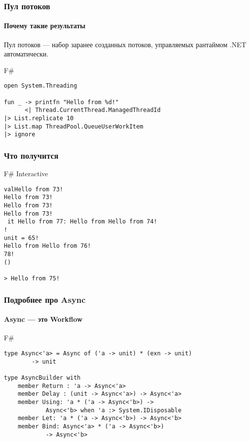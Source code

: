 \documentclass[xetex,mathserif,serif]{beamer}
\begin{document}
	\begin{frame}[fragile]
		\frametitle{Пул потоков}
		\framesubtitle{Почему такие результаты}
		Пул потоков --- набор заранее созданных потоков, управляемых рантаймом .NET автоматически.
		\begin{exampleblock}{F\#}
			\begin{verbatim}
open System.Threading

fun _ -> printfn "Hello from %d!" 
      <| Thread.CurrentThread.ManagedThreadId
|> List.replicate 10
|> List.map ThreadPool.QueueUserWorkItem 
|> ignore
			\end{verbatim}
		\end{exampleblock}
\end{frame}

	\begin{frame}[fragile]
		\frametitle{Что получится}
		\begin{alertblock}{F\# Interactive}
			\begin{verbatim}
valHello from 73! 
Hello from 73! 
Hello from 73! 
Hello from 73! 
 it Hello from 77: Hello from Hello from 74! 
! 
unit = 65! 
Hello from Hello from 76! 
78! 
()

> Hello from 75! 
			\end{verbatim}
		\end{alertblock}
\end{frame}

	\begin{frame}[fragile]
		\frametitle{Подробнее про Async}
		\framesubtitle{Async --- это Workflow}
		\begin{exampleblock}{F\#}
			\begin{verbatim}
type Async<'a> = Async of ('a -> unit) * (exn -> unit) 
        -> unit

type AsyncBuilder with
    member Return : 'a -> Async<'a>
    member Delay : (unit -> Async<'a>) -> Async<'a>
    member Using: 'a * ('a -> Async<'b>) -> 
            Async<'b> when 'a :> System.IDisposable
    member Let: 'a * ('a -> Async<'b>) -> Async<'b>
    member Bind: Async<'a> * ('a -> Async<'b>) 
            -> Async<'b>
			\end{verbatim}
		\end{exampleblock}
\end{frame}
\end{document}
